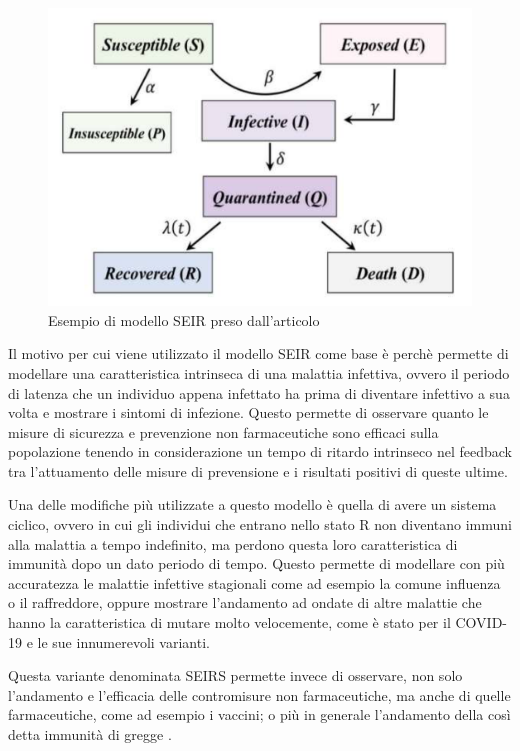 \newpage

\begin{figure}[h]
    \includegraphics[width=\linewidth]{img/ijerph-17-03535-g001.png}
    \caption{Esempio di modello SEIR preso dall'articolo \cite{ijerph17103535}}
    \label{fig:SEIR_model}
\end{figure}

Il motivo per cui viene utilizzato il modello SEIR come base è perchè permette di 
modellare una caratteristica intrinseca di una malattia infettiva, ovvero 
il periodo di latenza che un individuo appena infettato ha prima di diventare 
infettivo a sua volta e mostrare i sintomi di infezione. Questo permette 
di osservare quanto le misure di sicurezza e prevenzione non farmaceutiche 
sono efficaci sulla popolazione tenendo in considerazione 
un tempo di ritardo intrinseco nel feedback tra l'attuamento delle 
misure di prevensione e i risultati positivi di queste ultime.

Una delle modifiche più utilizzate a questo modello è quella di avere un sistema 
ciclico, ovvero in cui gli individui che entrano nello stato R non diventano immuni 
alla malattia a tempo indefinito, ma perdono questa loro caratteristica di immunità
dopo un dato periodo di tempo. Questo permette di modellare con più accuratezza le malattie
infettive stagionali come ad esempio la comune influenza o il raffreddore, oppure 
mostrare l'andamento ad ondate di altre malattie che hanno la caratteristica di 
mutare molto velocemente, come è stato per il COVID-19 e le sue innumerevoli varianti.

Questa variante denominata SEIRS permette invece di osservare, non solo l'andamento e 
l'efficacia delle contromisure non farmaceutiche, ma anche di quelle
farmaceutiche, come ad esempio i vaccini; o più in generale l'andamento
della così detta immunità di gregge \cite{Bjornstad2020}. 

